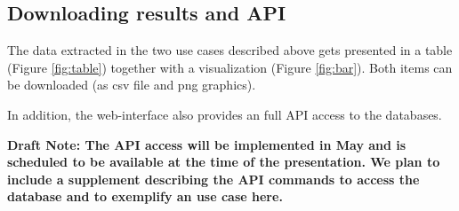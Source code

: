 \subsection{Downloading results and API}

The data extracted in the two use cases described above gets presented in a table (Figure \ref{fig:table}) together with a visualization (Figure \ref{fig:bar}). Both items can be downloaded (as csv file and png graphics).

In addition, the web-interface also provides an full API access to the databases. 

\textbf{Draft Note: The API access will be implemented in May and is scheduled to be available at the time of the presentation. We plan to include a supplement describing the API commands to access the database and to exemplify  an use case here.}

